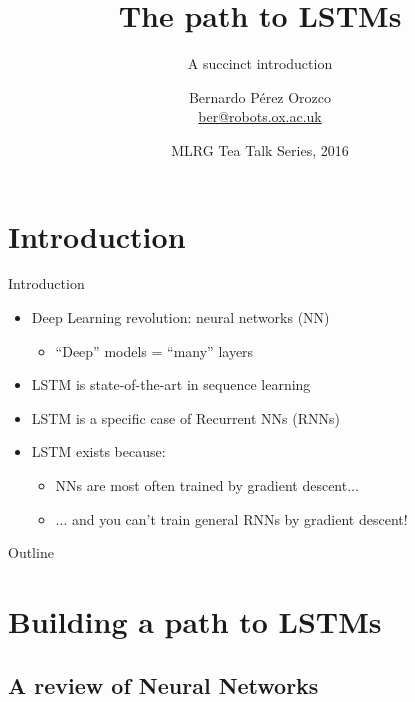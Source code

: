 \documentclass[handout]{beamer}
\title{The path to LSTMs}
\subtitle{A succinct introduction}
\author{Bernardo P\'erez Orozco \\ \href{mailto:ber@robots.ox.ac.uk}{ber@robots.ox.ac.uk} }
\institute[University of Oxford] %
{
  Department of Engineering Sciences\\
  University of Oxford}
\date{MLRG Tea Talk Series, 2016}
\theoremstyle{definition}
\theoremstyle{remark}
\begin{document}
\begin{frame}
  \titlepage
\end{frame}



\section*{Introduction}

\begin{frame}{Introduction}
  \begin{itemize}
      \item{ Deep Learning revolution: neural networks (NN) \pause
      \begin{itemize}
          \item ``Deep'' models = ``many'' layers \pause
      \end{itemize}
      }
      \item LSTM is state-of-the-art in sequence learning \pause
      \item LSTM is a specific case of Recurrent NNs (RNNs) \pause
      \item LSTM exists because: \pause
      \begin{itemize}
          \item NNs are most often trained by gradient descent... \pause
          \item ... and you can't train general RNNs by gradient descent!
      \end{itemize}
  \end{itemize}
\end{frame}

\begin{frame}{Outline}
  \tableofcontents
\end{frame}

\section{Building a path to LSTMs}

\subsection{A review of Neural Networks}
\end{document}
